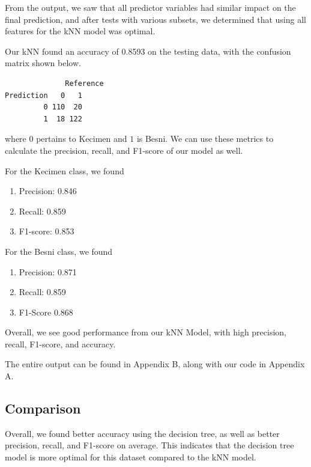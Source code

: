 \documentclass{article}
\begin{document}
From the output, we saw that all predictor variables had similar impact on the final prediction, and after tests with various subsets, we determined that using all features for the kNN model was optimal.

Our kNN found an accuracy of 0.8593 on the testing data, with the confusion matrix shown below.

\begin{verbatim}
              Reference
Prediction   0   1
         0 110  20
         1  18 122
\end{verbatim}

where $0$ pertains to Kecimen and $1$ is Besni. We can use these metrics to calculate the precision, recall, and F1-score of our model as well.

For the Kecimen class, we found

\begin{enumerate}
    \item Precision: 0.846

    \item Recall: 0.859

    \item F1-score: 0.853
\end{enumerate}

For the Besni class, we found

\begin{enumerate}
    \item Precision: 0.871

    \item Recall: 0.859

    \item F1-Score 0.868
\end{enumerate}

Overall, we see good performance from our kNN Model, with high precision, recall, F1-score, and accuracy.

The entire output can be found in Appendix B, along with our code in Appendix A.

\subsection{Comparison}

Overall, we found better accuracy using the decision tree, as well as better precision, recall, and F1-score on average. This indicates that the decision tree model is more optimal for this dataset compared to the kNN model.
\end{document}
